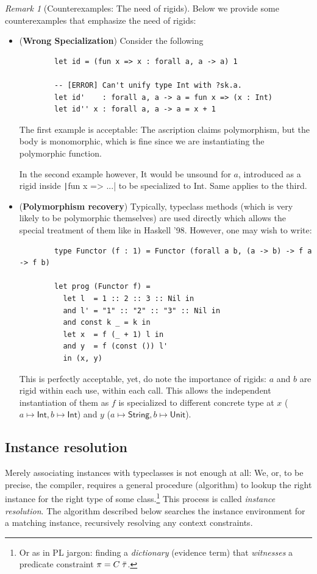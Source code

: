 \documentclass[a4paper, 11pt]{article}
\theoremstyle{remark}\newtheorem*{remark}{Remark}
\theoremstyle{definition}\newtheorem*{definition}{Definition}
\begin{document}
\begin{remark}[Counterexamples: The need of rigids]
Below we provide some counterexamples that emphasize the need of rigids:
\begin{itemize}
  \item (\textbf{Wrong Specialization}) Consider the following
      \begin{verbatim}
        let id = (fun x => x : forall a, a -> a) 1

        -- [ERROR] Can't unify type Int with ?sk.a.
        let id'    : forall a, a -> a = fun x => (x : Int)
        let id'' x : forall a, a -> a = x + 1
      \end{verbatim}
    The first example is acceptable: The ascription claims polymorphism, but the body is monomorphic,
    which is fine since we are instantiating the polymorphic function.

    In the second example however,
    It would be unsound for \(a\), introduced as a rigid inside \texttt|fun x => ...|
    to be specialized to Int. Same applies to the third.

  \item (\textbf{Polymorphism recovery}) Typically, typeclass methods
    (which is very likely to be polymorphic themselves) are used directly which allows
    the special treatment of them like in Haskell '98.
    However, one may wish to write:
      \begin{verbatim}
        type Functor (f : 1) = Functor (forall a b, (a -> b) -> f a -> f b)

        let prog (Functor f) =
          let l  = 1 :: 2 :: 3 :: Nil in
          and l' = "1" :: "2" :: "3" :: Nil in
          and const k _ = k in
          let x  = f (_ + 1) l in
          and y  = f (const ()) l'
          in (x, y)
      \end{verbatim}
    This is perfectly acceptable, yet, do note the importance of rigids:
    \(a\) and \(b\) are rigid within each use,
    within each call. This allows the independent instantiation of them as
    \(f\) is specialized to different concrete type
    at \(x\) (\(a\mapsto \mathsf{Int}, b\mapsto\mathsf{Int}\))
    and \(y\) (\(a\mapsto \mathsf{String}, b\mapsto\mathsf{Unit}\)).
\end{itemize}
\end{remark}

\subsection{Instance resolution}
Merely associating instances with typeclasses is not enough at all: We, or, to be precise,
the compiler, requires a general procedure (algorithm) to
lookup the right instance for the right type of some class.\footnote{
Or as in PL jargon: finding a \emph{dictionary} (evidence term) that \emph{witnesses} a
predicate constraint \(\pi = C\;\bar{\tau}\).
}
This process is called \emph{instance resolution}. The algorithm described below searches
the instance environment for a matching instance, recursively resolving any context constraints.
\end{document}
